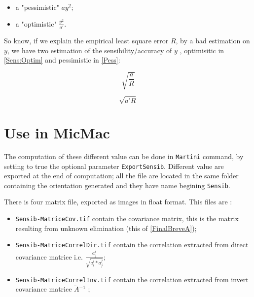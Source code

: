 \begin{itemize}
   \item a "pessimistic" $a y^2$;
   \item a "optimistic" $\frac{y^2}{a'}$.
\end{itemize}

So know, if we explain the empirical least square error $R$, by
a bad estimation on $y$, we have two estimation of the sensibility/accuracy of $y$ ,
optimisitic in \ref{Sens:Optim} and pessimistic in \ref{Pess}:

\begin{equation}
  \sqrt{\frac{a}{R}}
  \label{Sens:Optim}
\end{equation}


\begin{equation}
  \sqrt{a'R}
  \label{Sens:Pess}
\end{equation}



\section{Use in MicMac}

The computation of these different value can be done in {\tt Martini} command,
by setting to true the optional parameter {\tt ExportSensib}. Different
value are exported at the end of computation; all the file are located
in the same folder containing the orientation generated and they  have name
begining  {\tt Sensib}.


There is four matrix file, exported as images in float format. This files
are : 

\begin{itemize}
     \item {\tt Sensib-MatriceCov.tif}  contain the covariance matrix,
           this is the matrix resulting from unknown elimination (this of \ref{FinalBreveA});

     \item {\tt Sensib-MatriceCorrelDir.tif}  contain the correlation extracted from
           direct covariance matrice i.e.  $ \frac{a^i_j}{\sqrt{a^i_i * a^j_j}}$;

     \item {\tt Sensib-MatriceCorrelInv.tif}  contain the correlation extracted from
           invert covariance matrice $\breve{A} {^{-1}}$  ;
\end{itemize}

